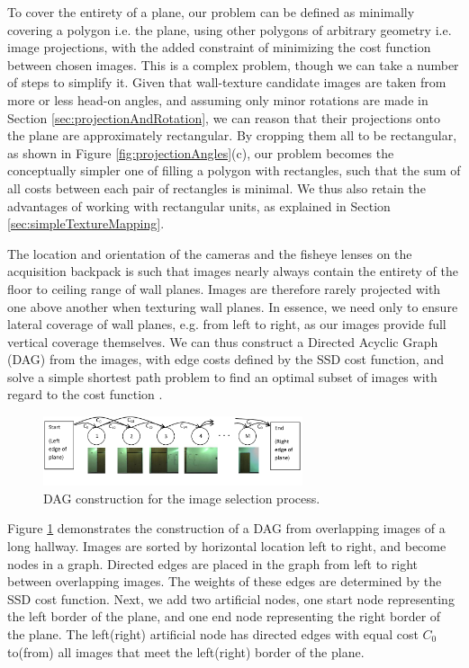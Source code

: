\documentclass[10pt,twocolumn,letterpaper]{article}
\begin{document}
To cover the entirety of a plane, our problem can be defined as
minimally covering a polygon i.e. the plane, using other polygons of
arbitrary geometry i.e. image projections, with the added constraint
of minimizing the cost function between chosen images.  This is a
complex problem, though we can take a number of steps to simplify
it. Given that wall-texture candidate images are taken from more or
less head-on angles, and assuming only minor rotations are made in
Section \ref{sec:projectionAndRotation}, we can reason that their
projections onto the plane are approximately rectangular. By cropping
them all to be rectangular, as shown in Figure
\ref{fig:projectionAngles}(c), our problem becomes the conceptually
simpler one of filling a polygon with rectangles, such that the sum of
all costs between each pair of rectangles is minimal. We thus also
retain the advantages of working with rectangular units, as explained
in Section \ref{sec:simpleTextureMapping}.

The location and orientation of the cameras and the fisheye lenses on
the acquisition backpack is such that images nearly always contain the
entirety of the floor to ceiling range of wall planes. Images are
therefore rarely projected with one above another when texturing wall
planes. In essence, we need only to ensure lateral coverage of wall
planes, e.g. from left to right, as our images provide full vertical
coverage themselves. We can thus construct a Directed Acyclic Graph
(DAG) from the images, with edge costs defined by the SSD cost
function, and solve a simple shortest path problem to find an optimal
subset of images with regard to the cost function \cite{dijkstra}.

\begin{figure}
  \centering
  \includegraphics[width=3in]{dagCreation.pdf}
  \caption{DAG construction for the image selection process.}
  \label{fig:dagCreation}
\end{figure}

Figure \ref{fig:dagCreation} demonstrates the construction of a DAG
from overlapping images of a long hallway. Images are sorted by
horizontal location left to right, and become nodes in a
graph. Directed edges are placed in the graph from left to right
between overlapping images. The weights of these edges are determined
by the SSD cost function. Next, we add two artificial nodes, one start
node representing the left border of the plane, and one end node
representing the right border of the plane. The left(right) artificial
node has directed edges with equal cost $C_0$ to(from) all images that
meet the left(right) border of the plane.
\end{document}
